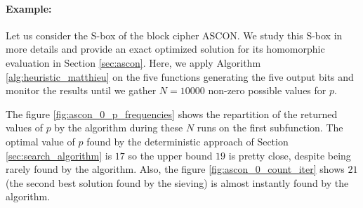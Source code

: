 \paragraph{Example:} Let us consider the \gls{S-box} of the block cipher ASCON. We study this \gls{S-box} in more details and provide an exact optimized solution for its homomorphic evaluation in Section \ref{sec:ascon}. Here, we apply Algorithm \ref{alg:heuristic_matthieu} on the five functions generating the five output bits and monitor the results until we gather $N=10000$ non-zero possible values for $p$.


The figure \ref{fig:ascon_0_p_frequencies} shows the repartition of the returned values of $p$ by the algorithm during these $N$ runs on the first subfunction. The optimal value of $p$ found by the deterministic approach of Section \ref{sec:search_algorithm} is $17$ so the upper bound $19$ is pretty close, despite being rarely found by the algorithm. Also, the figure \ref{fig:ascon_0_count_iter} shows $21$ (the second best solution found by the sieving) is almost instantly found by the algorithm.


